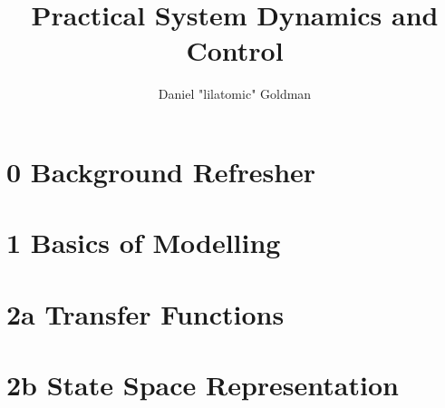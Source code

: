 \documentclass{templates/topic}
\title{Practical System Dynamics and Control}
\author{Daniel "lilatomic" Goldman}
\begin{document}
\maketitle

\part*{0 Background Refresher}



\part*{1 Basics of Modelling}





\part*{2a Transfer Functions}







\part*{2b State Space Representation}





\end{document}
